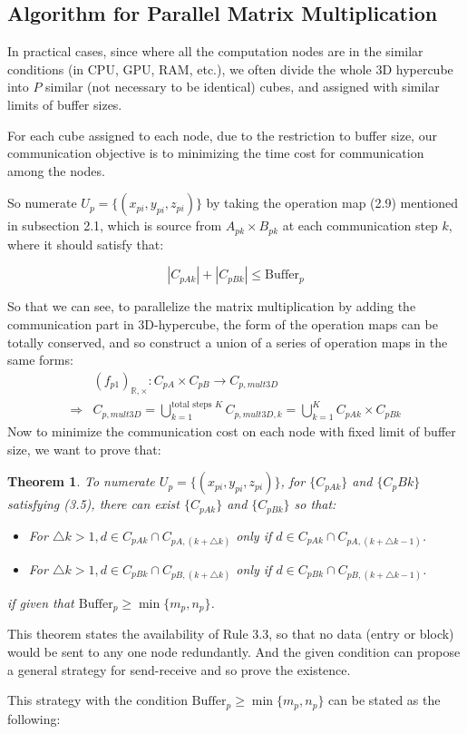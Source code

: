 \documentclass{amsart}
\newtheorem{theorem}{Theorem}[section]
\theoremstyle{definition}
\theoremstyle{remark}
\numberwithin{equation}{section}
\begin{document}
\subsection{Algorithm for Parallel Matrix Multiplication}
	In practical cases, since where all the computation nodes are in the similar conditions (in CPU, GPU, RAM, etc.), we often divide the whole 3D hypercube into $P$ similar (not necessary to be identical) cubes, and assigned with similar limits of buffer sizes.\par
	For each cube assigned to each node, due to the restriction to buffer size, our communication objective is to minimizing the time cost for communication among the nodes.\par
	So numerate $U_p=\{(x_{pi},y_{pi},z_{pi})\}$ by taking the operation map (2.9) mentioned in subsection 2.1, which is source from $A_{pk}\times B_{pk}$ at each communication step $k$, where it should satisfy that:\par
\begin{equation}
|C_{pAk}|+|C_{pBk}|\le \text{Buffer}_p
\end{equation}
\par
	So that we can see, to parallelize the matrix multiplication by adding the communication part in 3D-hypercube, the form of the operation maps can be totally conserved, and so construct a union of a series of operation maps in the same forms:
\begin{equation}
\begin{array}{ll}
&(f_{p1})_{\mathbb{R},\times}:C_{pA}\times C_{pB}\to C_{p,mult3D}\\
\Longrightarrow &
C_{p,mult3D}=\bigcup_{k=1}^{\text{total steps }K}C_{p,mult3D,k}=\bigcup_{k=1}^{K}C_{pAk}\times C_{pBk}
\end{array}
\end{equation}
Now to minimize the communication cost on each node with fixed limit of buffer size, we want to prove that:\par
\begin{theorem}
To numerate $U_p=\{(x_{pi},y_{pi},z_{pi})\}$, for $\{C_{pAk}\}$ and $\{{C_pBk}\}$ satisfying (3.5), there can exist $\{{C_{pAk}}\}$ and $\{C_{pBk}\}$ so that:
\begin{itemize}
\item For $\bigtriangleup k>1,d\in C_{pAk}\cap C_{pA,(k+\bigtriangleup k)}$ only if $d\in C_{pAk}\cap C_{pA,(k+\bigtriangleup k-1)}$.
\item For $\bigtriangleup k>1,d\in C_{pBk}\cap C_{pB,(k+\bigtriangleup k)}$ only if $d\in C_{pBk}\cap C_{pB,(k+\bigtriangleup k-1)}$.
\end{itemize}
if given that $\text{Buffer}_p\ge \min\{m_p,n_p\}$.
\end{theorem}
\par
	This theorem states the availability of Rule 3.3, so that no data (entry or block) would be sent to any one node redundantly. And the given condition can propose a general strategy for send-receive and so prove the existence.\par
	This strategy with the condition $\text{Buffer}_p\ge \min\{m_p,n_p\}$ can be stated as the following:
\end{document}
